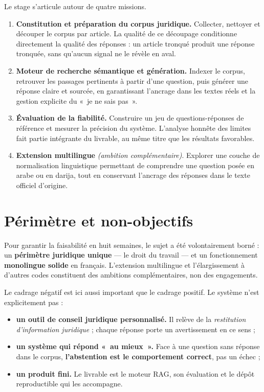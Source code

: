 Le stage s'articule autour de quatre missions.

\begin{enumerate}
  \item \textbf{Constitution et préparation du corpus juridique.} Collecter, nettoyer et découper
        le corpus par article. La qualité de ce découpage conditionne directement la qualité des
        réponses : un article tronqué produit une réponse tronquée, sans qu'aucun signal ne le
        révèle en aval.
  \item \textbf{Moteur de recherche sémantique et génération.} Indexer le corpus, retrouver les
        passages pertinents à partir d'une question, puis générer une réponse claire et sourcée,
        en garantissant l'ancrage dans les textes réels et la gestion explicite du «~je ne sais
        pas~».
  \item \textbf{Évaluation de la fiabilité.} Construire un jeu de questions-réponses de référence
        et mesurer la précision du système. L'analyse honnête des limites fait partie intégrante
        du livrable, au même titre que les résultats favorables.
  \item \textbf{Extension multilingue} \textit{(ambition complémentaire)}. Explorer une couche de
        normalisation linguistique permettant de comprendre une question posée en arabe ou en
        darija, tout en conservant l'ancrage des réponses dans le texte officiel d'origine.
\end{enumerate}

\section{Périmètre et non-objectifs}

Pour garantir la faisabilité en huit semaines, le sujet a été volontairement borné : un
\textbf{périmètre juridique unique} --- le droit du travail --- et un fonctionnement
\textbf{monolingue solide} en français. L'extension multilingue et l'élargissement à d'autres
codes constituent des ambitions complémentaires, non des engagements.

Le cadrage négatif est ici aussi important que le cadrage positif. Le système n'est explicitement
pas :

\begin{itemize}
  \item \textbf{un outil de conseil juridique personnalisé.} Il relève de la \emph{restitution
        d'information juridique} ; chaque réponse porte un avertissement en ce sens ;
  \item \textbf{un système qui répond «~au mieux~».} Face à une question sans réponse dans le
        corpus, \textbf{l'abstention est le comportement correct}, pas un échec ;
  \item \textbf{un produit fini.} Le livrable est le moteur RAG, son évaluation et le dépôt
        reproductible qui les accompagne.
\end{itemize}

